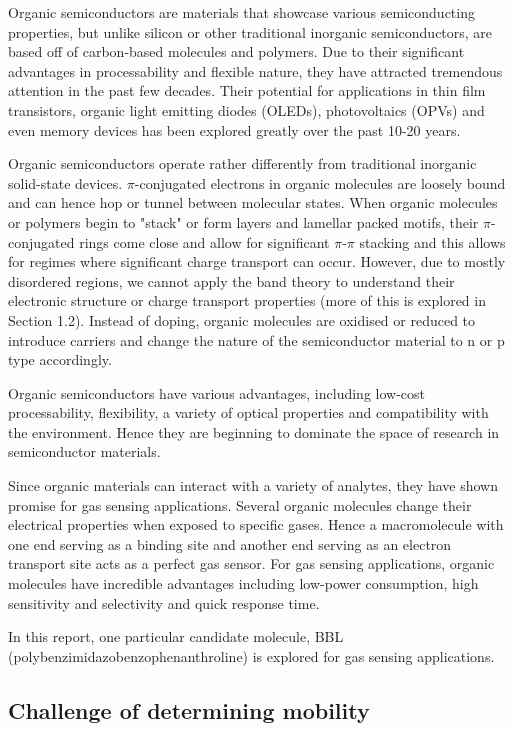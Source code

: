 \documentclass{article}
\begin{document}
Organic semiconductors are materials that showcase various semiconducting properties, but unlike silicon or other traditional inorganic semiconductors, are based off of carbon-based molecules and polymers. Due to their significant advantages in processability and flexible nature, they have attracted tremendous attention in the past few decades. Their potential for applications in thin film transistors, organic light emitting diodes (OLEDs), photovoltaics (OPVs) and even memory devices has been explored greatly over the past 10-20 years. %

Organic semiconductors operate rather differently from traditional inorganic solid-state devices. $\pi$-conjugated electrons in organic molecules are loosely bound and can hence hop or tunnel between molecular states. When organic molecules or polymers begin to "stack" or form layers and lamellar packed motifs, their $\pi$-conjugated rings come close and allow for significant $\pi$-$\pi$ stacking and this allows for regimes where significant charge transport can occur. However, due to mostly disordered regions, we cannot apply the band theory to understand their electronic structure or charge transport properties (more of this is explored in Section 1.2). Instead of doping, organic molecules are oxidised or reduced to introduce carriers and change the nature of the semiconductor material to n or p type accordingly.

Organic semiconductors have various advantages, including low-cost processability, flexibility, a variety of optical properties and compatibility with the environment. Hence they are beginning to dominate the space of research in semiconductor materials.

Since organic materials can interact with a variety of analytes, they have shown promise for gas sensing applications. Several organic molecules change their electrical properties when exposed to specific gases. Hence a macromolecule with one end serving as a binding site and another end serving as an electron transport site acts as a perfect gas sensor. For gas sensing applications, organic molecules have incredible advantages including low-power consumption, high sensitivity and selectivity and quick response time. 

In this report, one particular candidate molecule, BBL (polybenzimidazobenzophenanthroline) is explored for gas sensing applications.

\subsection{Challenge of determining mobility}
\end{document}
